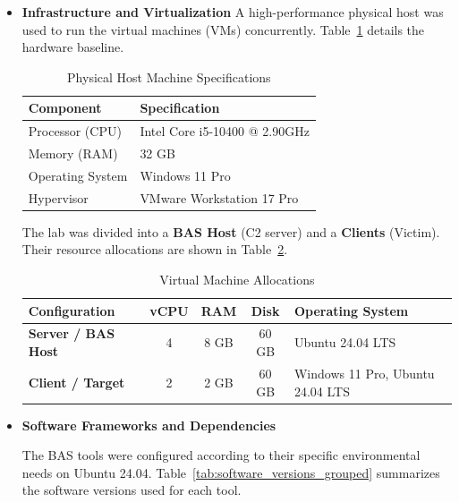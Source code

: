 \begin{itemize}
\item \textbf{Infrastructure and Virtualization}
A high-performance physical host was used to run the virtual machines (VMs) concurrently. Table~\ref{tab:host_specs} details the hardware baseline.
\begin{table}[h]
    \centering
    \caption{Physical Host Machine Specifications}
    \label{tab:host_specs}
    \renewcommand{\arraystretch}{1.3}
    \begin{tabular}{l l}
    \toprule
    \textbf{Component} & \textbf{Specification} \\ 
    \midrule
    Processor (CPU) & Intel Core i5-10400 @ 2.90GHz \\
    Memory (RAM) & 32 GB \\
    Operating System & Windows 11 Pro \\
    Hypervisor & VMware Workstation 17 Pro \\
    \bottomrule
    \end{tabular}
\end{table}
\noindent The lab was divided into a \textbf{BAS Host} (C2 server) and a \textbf{Clients} (Victim). Their resource allocations are shown in Table~\ref{tab:vm_specs}.
\begin{table}
    \centering
    \caption{Virtual Machine Allocations}
    \label{tab:vm_specs}
    \renewcommand{\arraystretch}{1.2}
    \begin{tabularx}{\textwidth}{l c c c X}
    \toprule
    \textbf{Configuration} & \textbf{vCPU} & \textbf{RAM} & \textbf{Disk} & \textbf{Operating System} \\ 
    \midrule
    \textbf{Server / BAS Host} & 4 & 8 GB & 60 GB & Ubuntu 24.04 LTS \\
    \textbf{Client / Target} & 2 & 2 GB & 60 GB & Windows 11 Pro, Ubuntu 24.04 LTS \\
    \bottomrule
    \end{tabularx}
\end{table}

\item \textbf{Software Frameworks and Dependencies}

The BAS tools were configured according to their specific environmental needs on Ubuntu 24.04. Table~\ref{tab:software_versions_grouped} summarizes the software versions used for each tool.



\end{itemize}
